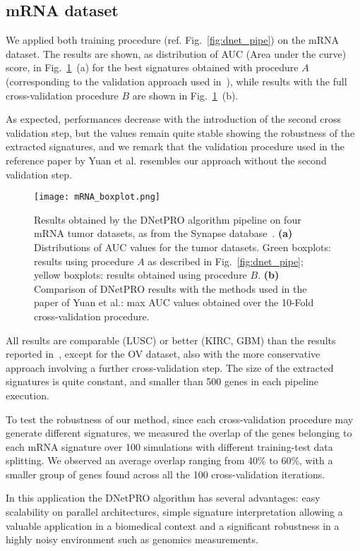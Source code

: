 \documentclass{standalone}
\begin{document}
\subsection[mRNA data]{mRNA dataset}\label{synapse:mRNA}

We applied both training procedure (ref. Fig.~\ref{fig:dnet_pipe}) on the mRNA dataset.
The results are shown, as distribution of AUC (Area under the curve) score, in Fig.~\ref{fig:dnet_results}~(a) for the best signatures obtained with procedure $A$ (corresponding to the validation approach used in~\cite{Yuan2014}), while results with the full cross-validation procedure $B$ are shown in Fig.~\ref{fig:dnet_results}~(b).

As expected, performances decrease with the introduction of the second cross validation step, but the values remain quite stable showing the robustness of the extracted signatures, and we remark that the validation procedure used in the reference paper by Yuan et al. resembles our approach without the second validation step.

\begin{figure}[htbp]
\texttt{[image: mRNA\_boxplot.png]}
\qquad
\centering
\def\svgwidth{0.45\textwidth}

\caption{Results obtained by the \textsf{DNetPRO} algorithm pipeline on four mRNA tumor datasets, as from the Synapse database~\cite{Yuan2014}.
\textbf{(a)} Distributions of AUC values for the tumor datasets. Green boxplots: results using procedure $A$ as described in Fig.~\ref{fig:dnet_pipe}; yellow boxplots: results obtained using procedure $B$.
\textbf{(b)} Comparison of \textsf{DNetPRO} results with the methods used in the paper of Yuan et al.: max AUC values obtained over the 10-Fold cross-validation procedure.
}
\label{fig:dnet_results}
\end{figure}

All results are comparable (LUSC) or better (KIRC, GBM) than the results reported in~\cite{Yuan2014}, except for the OV dataset, also with the more conservative approach involving a further cross-validation step.
The size of the extracted signatures is quite constant, and smaller than 500 genes in each pipeline execution.

To test the robustness of our method, since each cross-validation procedure may generate different signatures, we measured the overlap of the genes belonging to each mRNA signature over 100 simulations with different training-test data splitting.
We observed an average overlap ranging from 40\% to 60\%, with a smaller group of genes found across all the 100 cross-validation iterations.

In this application the \textsf{DNetPRO} algorithm has several advantages: easy scalability on parallel architectures, simple signature interpretation allowing a valuable application in a biomedical context and a significant robustness in a highly noisy environment such as genomics measurements.
\end{document}
